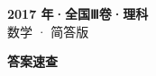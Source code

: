 \documentclass[zihao=-4, a4paper]{ctexart}
\begin{document}
\begin{center}
  {\Large\bfseries 2017 年·全国Ⅲ卷·理科}\\[4pt]
  {\large 数学 · 简答版}
\end{center}
\medskip
{}

\clearpage
{}
\begin{center}{\Large\bfseries 答案速查}\end{center}
\medskip

\end{document}
